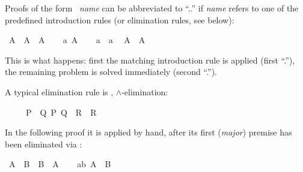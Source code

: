 \begin{isabellebody}
\begin{isamarkuptext}
Proofs of the form ~\emph{name}\isa{{\isacharparenright}}
can be abbreviated to ``..'' if \emph{name} refers to one of the
predefined introduction rules (or elimination rules, see below):%
\end{isamarkuptext}%
\isamarkuptrue%
\isamarkupfalse%
\ {\isachardoublequoteopen}A\ {\isasymlongrightarrow}\ A\ {\isasymand}\ A{\isachardoublequoteclose}\isanewline
%
\isadelimproof
%
\endisadelimproof
%
\isatagproof
{}\isamarkupfalse%
\isanewline
\ \ \isamarkupfalse%
\ a{\isacharcolon}\ {\isachardoublequoteopen}A{\isachardoublequoteclose}\isanewline
\ \ \isamarkupfalse%
\ a\ \ a\ \isamarkupfalse%
\ {\isachardoublequoteopen}A\ {\isasymand}\ A{\isachardoublequoteclose}\ \isacommand{{\isachardot}{\isachardot}}\isamarkupfalse%
\isanewline
{}\isamarkupfalse%
%
\endisatagproof
{\isafoldproof}%
%
\isadelimproof
%
\endisadelimproof
%
\begin{isamarkuptext}%
\noindent
This is what happens: first the matching introduction rule 
is applied (first ``.''), the remaining problem is solved immediately (second ``.'').%
\end{isamarkuptext}%
\isamarkuptrue%
%
\isamarkuptrue%
%
\begin{isamarkuptext}%
A typical elimination rule is , $\land$-elimination:
\begin{isabelle}%
\ \ \ \ \ {\isasymlbrakk}{\isacharquery}P\ {\isasymand}\ {\isacharquery}Q{\isacharsemicolon}\ {\isasymlbrakk}{\isacharquery}P{\isacharsemicolon}\ {\isacharquery}Q{\isasymrbrakk}\ {\isasymLongrightarrow}\ {\isacharquery}R{\isasymrbrakk}\ {\isasymLongrightarrow}\ {\isacharquery}R%
\end{isabelle}  In the following proof it is applied
by hand, after its first (\emph{major}) premise has been eliminated via
:%
\end{isamarkuptext}%
\isamarkuptrue%
\isamarkupfalse%
\ {\isachardoublequoteopen}A\ {\isasymand}\ B\ {\isasymlongrightarrow}\ B\ {\isasymand}\ A{\isachardoublequoteclose}\isanewline
%
\isadelimproof
%
\endisadelimproof
%
\isatagproof
{}\isamarkupfalse%
\isanewline
\ \ \isamarkupfalse%
\ ab{\isacharcolon}\ {\isachardoublequoteopen}A\ {\isasymand}\ B{\isachardoublequoteclose}\isanewline
\ \ \isamarkupfalse%

\end{isabellebody}
